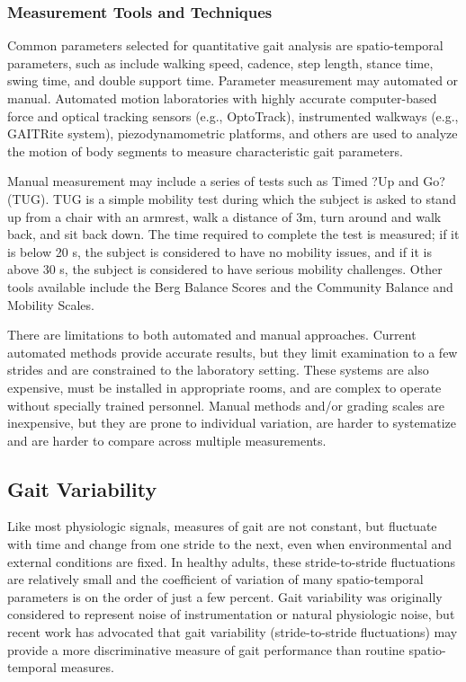 \documentclass[11pt, oneside]{report}   	%
\begin{document}
\subsubsection{Measurement Tools and Techniques}

Common parameters selected for quantitative gait analysis are spatio-temporal parameters, such as include walking speed, cadence, step length, stance time, swing time, and double support time\cite{Mudge2007}. Parameter measurement may automated or manual. Automated motion laboratories with highly accurate computer-based force and optical tracking sensors (e.g., OptoTrack), instrumented walkways (e.g., GAITRite system), piezodynamometric platforms, and others are used to analyze the motion of body segments to measure characteristic gait parameters\cite{Khusainov2013}. 

Manual measurement may include a series of tests such as Timed ?Up and Go? (TUG)\cite{Khusainov2013}. TUG is a simple mobility test during which the subject is asked to stand up from a chair with an armrest, walk a distance of 3m, turn around and walk back, and sit back down\cite{Herman2011}. The time required to complete the test is measured; if it is below 20 s, the subject is considered to have no mobility issues, and if it is above 30 s, the subject is considered to have serious mobility challenges. Other tools available include the Berg Balance Scores and the Community Balance and Mobility Scales\cite{Steffen2002a}.

There are limitations to both automated and manual approaches. Current automated methods provide accurate results, but they limit examination to a few strides and are constrained to the laboratory setting. These systems are also expensive, must be installed in appropriate rooms, and are complex to operate without specially trained personnel\cite{SantAnna2009}. Manual methods and/or grading scales are inexpensive, but they are prone to individual variation, are harder to systematize and are harder to compare across multiple measurements\cite{Khusainov2013}.

\subsection{Gait Variability}

Like most physiologic signals, measures of gait are not constant, but fluctuate with time and change from one stride to the next, even when environmental and external conditions are fixed\cite{Hausdorff2005}. In healthy adults, these stride-to-stride fluctuations are relatively small and the coefficient of variation of many spatio-temporal parameters is on the order of just a few percent\cite{Gabell1984}. Gait variability was originally considered to represent noise of instrumentation or natural physiologic noise, but recent work has advocated that gait variability (stride-to-stride fluctuations) may provide a more discriminative measure of gait performance than routine spatio-temporal measures\cite{Lord2011}.
\end{document}
